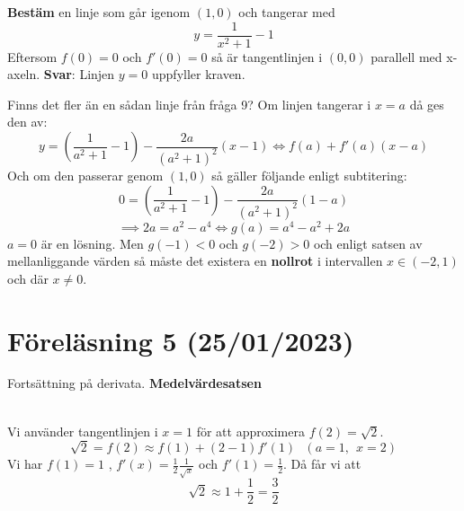 \documentclass{report}
\begin{document}
\vspace{20pt}
\qs{}
{
\textbf{Bestäm} en linje som går igenom $ (1,0) $ och tangerar med
\begin{equation*}
y= \frac{1}{x^2+1} -1
\end{equation*}
}
\sol Eftersom $ f(0) = 0 $ och $ f'(0) = 0 $ så är tangentlinjen i $ (0,0) $ parallell med x-axeln. \textbf{Svar}: Linjen $ y=0 $ uppfyller kraven.     

\qs{}
{
Finns det fler än en sådan linje från fråga 9?
}
\sol Om linjen tangerar i $ x=a $ då ges den av:
\begin{equation*}
y = ( \frac{1}{a^2+1} -1)- \frac{2a}{(a^2+1)^2}(x-1) \iff f(a)+f'(a)(x-a) 
\end{equation*}
Och om den passerar genom $ (1,0) $ så gäller följande enligt subtitering:
\begin{equation*}
	0 = ( \frac{1}{a^2+1} -1)- \frac{2a}{(a^2+1)^2}(1-a) 
\end{equation*}
\begin{equation*}
	\implies 2a=a^2-a^4 \iff g(a) = a^4-a^2+2a
\end{equation*}
$ a=0 $ är en lösning. Men $ g(-1) < 0 $ och $ g(-2) > 0 $ och enligt satsen av mellanliggande värden så måste det existera en \textbf{nollrot} i intervallen $ x \in (-2,1) $ och där $ x \ne 0 $.  

\pagebreak

\section{Föreläsning 5 (25/01/2023)}
Fortsättning på derivata. \textbf{Medelvärdesatsen} \\\\

{
Vi använder tangentlinjen i $ x =1$ för att approximera $ f(2) = \sqrt{2}  $.
\begin{equation*}
\sqrt{2} = f(2) \approx f(1)+(2-1)f'(1)\:\:\:(a=1,\:\:x=2) 
\end{equation*}
Vi har $ f(1) = 1 $ , $ f'(x) = \frac{1}{2} \frac{1}{ \sqrt{x} }  $ och $ f'(1) = \frac{1}{2}  $. Då får vi att
\begin{equation*}
\sqrt{2} \approx 1 + \frac{1}{2} = \frac{3}{2} 
\end{equation*}

}
\end{document}

